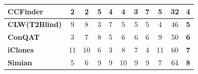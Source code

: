 \documentclass[review]{elsarticle}
\begin{document}
\begin{table}[]
\begin{tabular}{lcccccccccc}
\multicolumn{1}{|l|}{\textbf{CCFinder}}                                                         & \multicolumn{1}{c|}{2}           & \multicolumn{1}{c|}{2}           & \multicolumn{1}{c|}{5}           & \multicolumn{1}{c|}{4}           & \multicolumn{1}{c|}{4}           & \multicolumn{1}{c|}{3}           & \multicolumn{1}{c|}{7}           & \multicolumn{1}{c|}{5}           & \multicolumn{1}{c|}{32}                                                               & \multicolumn{1}{c|}{\textbf{4}}                                                    \\ \hline
\multicolumn{1}{|l|}{\textbf{CLW(T2Blind)}}                                                     & \multicolumn{1}{c|}{9}           & \multicolumn{1}{c|}{8}           & \multicolumn{1}{c|}{3}           & \multicolumn{1}{c|}{7}           & \multicolumn{1}{c|}{5}           & \multicolumn{1}{c|}{5}           & \multicolumn{1}{c|}{5}           & \multicolumn{1}{c|}{4}           & \multicolumn{1}{c|}{46}                                                               & \multicolumn{1}{c|}{\textbf{5}}                                                    \\ \hline
\multicolumn{1}{|l|}{\textbf{ConQAT}}                                                           & \multicolumn{1}{c|}{3}           & \multicolumn{1}{c|}{7}           & \multicolumn{1}{c|}{8}           & \multicolumn{1}{c|}{5}           & \multicolumn{1}{c|}{6}           & \multicolumn{1}{c|}{6}           & \multicolumn{1}{c|}{6}           & \multicolumn{1}{c|}{9}           & \multicolumn{1}{c|}{50}                                                               & \multicolumn{1}{c|}{\textbf{6}}                                                    \\ \hline
\multicolumn{1}{|l|}{\textbf{iClones}}                                                          & \multicolumn{1}{c|}{11}          & \multicolumn{1}{c|}{10}          & \multicolumn{1}{c|}{6}           & \multicolumn{1}{c|}{3}           & \multicolumn{1}{c|}{8}           & \multicolumn{1}{c|}{7}           & \multicolumn{1}{c|}{4}           & \multicolumn{1}{c|}{11}          & \multicolumn{1}{c|}{60}                                                               & \multicolumn{1}{c|}{\textbf{7}}                                                    \\ \hline
\multicolumn{1}{|l|}{\textbf{Simian}}                                                           & \multicolumn{1}{c|}{5}           & \multicolumn{1}{c|}{6}           & \multicolumn{1}{c|}{9}           & \multicolumn{1}{c|}{9}           & \multicolumn{1}{c|}{10}          & \multicolumn{1}{c|}{9}           & \multicolumn{1}{c|}{9}           & \multicolumn{1}{c|}{7}           & \multicolumn{1}{c|}{64}                                                               & \multicolumn{1}{c|}{\textbf{8}}                                                    \\ \hline

\end{tabular}
\end{table}
\end{document}
